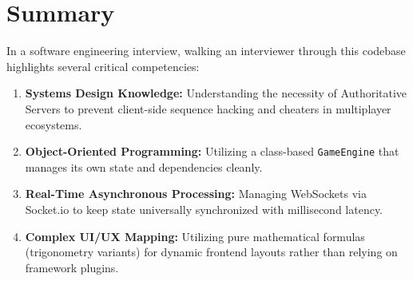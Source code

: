 \documentclass[11pt,a4paper]{article}
\begin{document}
\section{Summary}
In a software engineering interview, walking an interviewer through this codebase highlights several critical competencies:
\begin{enumerate}
    \item \textbf{Systems Design Knowledge:} Understanding the necessity of Authoritative Servers to prevent client-side sequence hacking and cheaters in multiplayer ecosystems.
    \item \textbf{Object-Oriented Programming:} Utilizing a class-based \texttt{GameEngine} that manages its own state and dependencies cleanly.
    \item \textbf{Real-Time Asynchronous Processing:} Managing WebSockets via Socket.io to keep state universally synchronized with millisecond latency.
    \item \textbf{Complex UI/UX Mapping:} Utilizing pure mathematical formulas (trigonometry variants) for dynamic frontend layouts rather than relying on framework plugins.
\end{enumerate}
\end{document}
